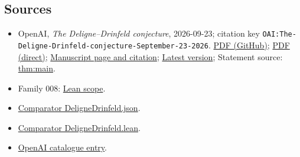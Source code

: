 \documentclass[11pt]{article}
\begin{document}
\subsection{Sources}
\begin{itemize}
\item OpenAI, \emph{The Deligne–Drinfeld conjecture}, 2026-09-23; citation key \texttt{OAI:The-Deligne-Drinfeld-conjecture-September-23-2026}. \href{https://github.com/openai/math/blob/adc7f1241b42e322a6451854ab7e4b4c146bf78a/preprints/The-Deligne-Drinfeld-conjecture-September-23-2026/paper.pdf}{PDF (GitHub)}; \href{https://github.com/openai/math/raw/adc7f1241b42e322a6451854ab7e4b4c146bf78a/preprints/The-Deligne-Drinfeld-conjecture-September-23-2026/paper.pdf}{PDF (direct)}; \href{https://github.com/openai/math/blob/adc7f1241b42e322a6451854ab7e4b4c146bf78a/preprints/The-Deligne-Drinfeld-conjecture-September-23-2026/README.md}{Manuscript page and citation}; \href{https://github.com/openai/math/blob/main/preprints/The-Deligne-Drinfeld-conjecture-September-23-2026/paper.pdf}{Latest version}; Statement source: \href{https://github.com/openai/math/blob/adc7f1241b42e322a6451854ab7e4b4c146bf78a/preprints/The-Deligne-Drinfeld-conjecture-September-23-2026/build/sections/01-introduction.tex\#L50}{thm:main}.
\item Family 008: \href{https://github.com/openai/math/blob/adc7f1241b42e322a6451854ab7e4b4c146bf78a/lean/docs/008.md}{Lean scope}.
\item \href{https://github.com/openai/math/blob/adc7f1241b42e322a6451854ab7e4b4c146bf78a/lean/ComparatorChallenges/DeligneDrinfeld.json}{Comparator DeligneDrinfeld.json}.
\item \href{https://github.com/openai/math/blob/adc7f1241b42e322a6451854ab7e4b4c146bf78a/lean/ComparatorChallenges/DeligneDrinfeld.lean}{Comparator DeligneDrinfeld.lean}.
\item \href{https://github.com/openai/math/blob/adc7f1241b42e322a6451854ab7e4b4c146bf78a/CONTENTS.md}{OpenAI catalogue entry}.
\end{itemize}
\end{document}
